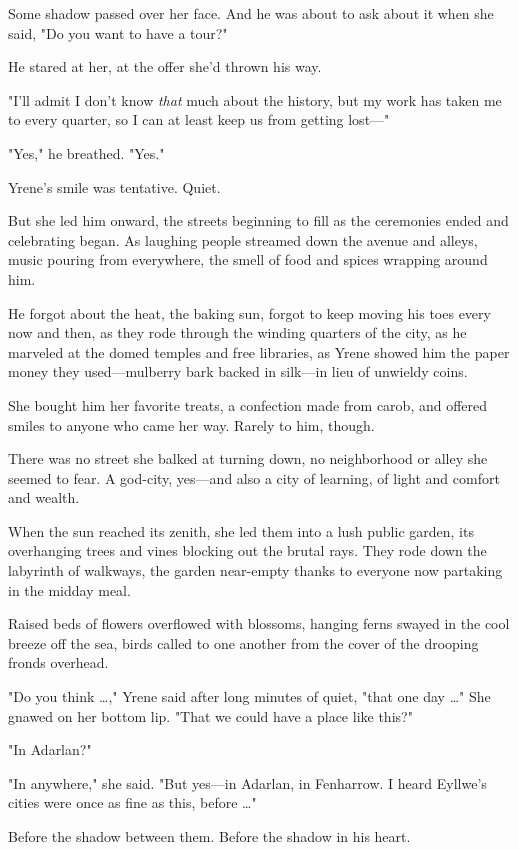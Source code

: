 Some shadow passed over her face.
And he was about to ask about it when she said, "Do you want to have a tour?"

He stared at her, at the offer she'd thrown his way.

"I'll admit I don't know \emph{that} much about the history, but my work has taken me to every quarter, so I can at least keep us from getting lost---"

"Yes," he breathed.
"Yes."

Yrene's smile was tentative.
Quiet.

But she led him onward, the streets beginning to fill as the ceremonies ended and celebrating began.
As laughing people streamed down the avenue and alleys, music pouring from everywhere, the smell of food and spices wrapping around him.

He forgot about the heat, the baking sun, forgot to keep moving his toes every now and then, as they rode through the winding quarters of the city, as he marveled at the domed temples and free libraries, as Yrene showed him the paper money they used---mulberry bark backed in silk---in lieu of unwieldy coins.

She bought him her favorite treats, a confection made from carob, and offered smiles to anyone who came her way.
Rarely to him, though.

There was no street she balked at turning down, no neighborhood or alley she seemed to fear.
A god-city, yes---and also a city of learning, of light and comfort and wealth.

When the sun reached its zenith, she led them into a lush public garden, its overhanging trees and vines blocking out the brutal rays.
They rode down the labyrinth of walkways, the garden near-empty thanks to everyone now partaking in the midday meal.

Raised beds of flowers overflowed with blossoms, hanging ferns swayed in the cool breeze off the sea, birds called to one another from the cover of the drooping fronds overhead.

"Do you think \ldots," Yrene said after long minutes of quiet, "that one day \ldots" She gnawed on her bottom lip.
"That we could have a place like this?"

"In Adarlan?"

"In anywhere," she said.
"But yes---in Adarlan, in Fenharrow.
I heard Eyllwe's cities were once as fine as this, before \ldots"

Before the shadow between them.
Before the shadow in his heart.

